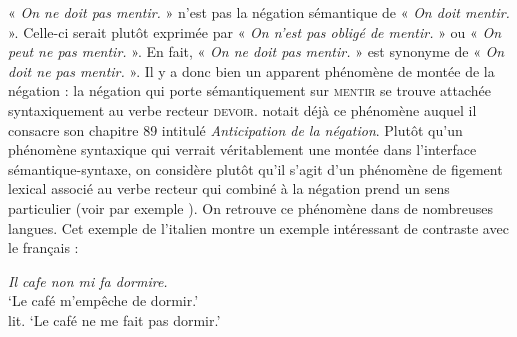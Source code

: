 { « \textit{On ne doit pas mentir.} » n’est pas la négation sémantique de « \textit{On doit mentir.} ». Celle-ci serait plutôt exprimée par « \textit{On n’est pas obligé de mentir.} » ou « \textit{On peut ne pas mentir.} ». En fait, « \textit{On ne doit pas mentir.} » est synonyme de « \textit{On doit ne pas mentir.} ». Il y a donc bien un apparent phénomène de montée de la négation : la négation qui porte sémantiquement sur \textsc{mentir} se trouve attachée syntaxiquement au verbe recteur \textsc{devoir}. \citet{tesniere1959elements} notait déjà ce phénomène auquel il consacre son chapitre 89 intitulé \textit{Anticipation de la négation}. Plutôt qu’un phénomène syntaxique qui verrait véritablement une montée dans l’interface sémantique-syntaxe, on considère plutôt qu’il s’agit d’un phénomène de figement lexical associé au verbe recteur qui combiné à la négation prend un sens particulier (voir par exemple \cite{forest1994negation}). On retrouve ce phénomène dans de nombreuses langues. Cet exemple de l’italien montre un exemple intéressant de contraste avec le français :

\begin{exe}
\exi{} \textit{Il cafe non mi fa dormire.}\\
‘Le café m’empêche de dormir.’\\
lit. ‘Le café ne me fait pas dormir.’
\end{exe}}
